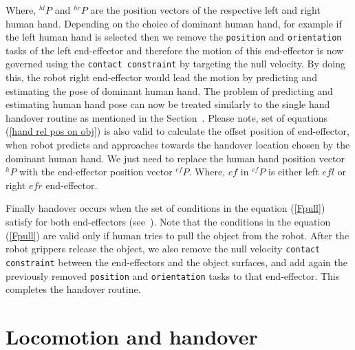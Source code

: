 Where, ${}^{hl}{P}$ and ${}^{hr}{P}$ are the position vectors of the respective left and right human hand. Depending on the choice of dominant human hand, for example if the left human hand is selected then we remove the \texttt{position} and \texttt{orientation} tasks of the left end-effector and therefore the motion of this end-effector is now governed using the \texttt{contact constraint} by targeting the null velocity. By doing this, the robot right end-effector would lead the motion by predicting and estimating the pose of dominant human hand. The problem of predicting and estimating human hand pose can now be treated similarly to the single hand handover routine as mentioned in the Section~. Please note, set of equations (\ref{hand rel pos on obj}) is also valid to calculate the offset position of end-effector, when robot predicts and approaches towards the handover location chosen by the dominant human hand. We just need to replace the human hand position vector ${}^{h}{P}$ with the end-effector position vector ${}^{ef}{P}$. Where, $ef$ in ${}^{ef}{P}$ is either left $efl$ or right $efr$ end-effector.


Finally handover occurs when the set of conditions in the equation (\ref{Fpull}) satisfy for both end-effectors (see~). Note that the conditions in the equation (\ref{Fpull}) are valid only if human tries to pull the object from the robot. After the robot grippers release the object, we also remove the null velocity \texttt{contact constraint} between the end-effectors and the object surfaces, and add again the previously removed \texttt{position} and \texttt{orientation} tasks to that end-effector. This completes the handover routine. 





\section{Locomotion and handover}


